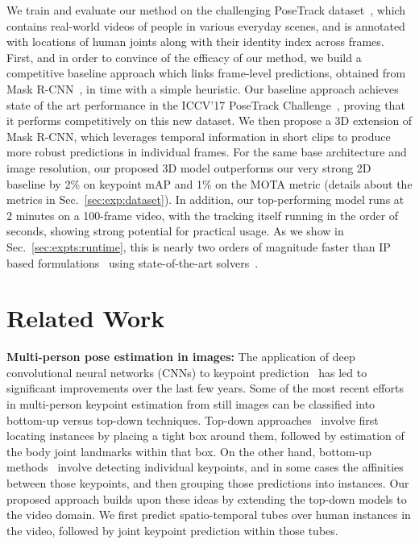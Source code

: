 \documentclass[10pt,twocolumn,letterpaper]{article}
\begin{document}
We train and evaluate our method on the challenging PoseTrack dataset~\cite{PoseTrack}, which contains real-world videos of people in various everyday scenes, and is annotated with locations of human joints along with their identity index across frames. First, and in order to convince of the efficacy of our method, we build a competitive baseline approach which links frame-level predictions, obtained from Mask R-CNN~\cite{he2017mask}, in time with a simple heuristic. Our baseline approach achieves state of the art performance in the ICCV'17 PoseTrack Challenge~\cite{posetrack_challenge}, proving that it performs competitively on this new dataset. We then propose a 3D extension of Mask R-CNN, which leverages temporal information in short clips to produce more robust predictions in individual frames. For the same base architecture and image resolution, our proposed 3D model outperforms our very strong 2D baseline by 2\% on keypoint mAP and 1\% on the MOTA metric  (details about the metrics in Sec.~\ref{sec:exp:dataset}). In addition, our top-performing model runs at
2 minutes on a 100-frame video, with the tracking itself running in the order of seconds, showing strong potential for practical usage.
As we show in Sec.~\ref{sec:expts:runtime}, this is nearly two orders of magnitude faster than IP based formulations~\cite{iqbal2016pose} using state-of-the-art solvers~\cite{gurobi}.








 
\section{Related Work}\label{sec:related}

{\noindent \bf Multi-person pose estimation in images:}
The application of deep convolutional neural networks (CNNs) to keypoint prediction~\cite{cao2017realtime,he2017mask,insafutdinov2016deepercut,papandreou2017towards} has led to significant improvements over the last few years. Some of the most recent efforts in multi-person keypoint estimation from still images can be classified into bottom-up versus top-down techniques. Top-down approaches~\cite{he2017mask,papandreou2017towards} involve first locating instances by placing a tight box around them, followed by estimation of the body joint landmarks within that box. On the other hand, bottom-up methods~\cite{cao2017realtime,insafutdinov2016deepercut} involve detecting individual keypoints, and in some cases the affinities between those keypoints, and then grouping those predictions into instances.
Our proposed approach builds upon these ideas by extending the top-down models to the video domain. We first predict spatio-temporal tubes over human instances in the video, followed by joint keypoint prediction within those tubes.
\end{document}

